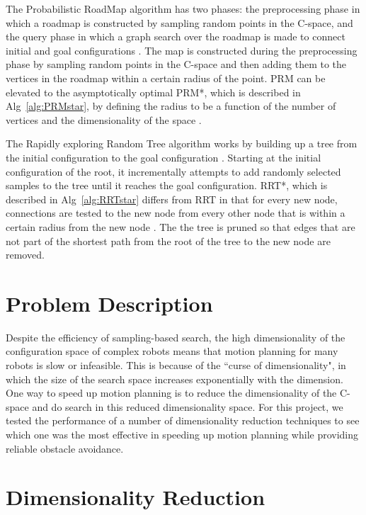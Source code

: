 \documentclass[12pt]{article}
\begin{document}
The Probabilistic RoadMap algorithm has two phases: the preprocessing phase in which a roadmap is constructed by sampling random points in the C-space, and the query phase in which a graph search over the roadmap is made to connect initial and goal configurations \cite{kavraki1996prm}. The map is constructed during the preprocessing phase by sampling random points in the C-space and then adding them to the vertices in the roadmap within a certain radius of the point. PRM can be elevated to the asymptotically optimal PRM*, which is described in Alg~\ref{alg:PRMstar}, by defining the radius to be a function of the number of vertices and the dimensionality of the space \cite{karaman2011sampling}.

The Rapidly exploring Random Tree algorithm works by building up a tree from the initial configuration to the goal configuration \cite{lavalle1998rrt}. Starting at the initial configuration of the root, it incrementally attempts to add randomly selected samples to the tree until it reaches the goal configuration. RRT*, which is described in Alg~\ref{alg:RRTstar} differs from RRT in that for every new node, connections are tested to the new node from every other node that is within a certain radius from the new node \cite{karaman2011sampling}. The the tree is pruned so that edges that are not part of the shortest path from the root of the tree to the new node are removed. 

\section{Problem Description}

Despite the efficiency of sampling-based search, the high dimensionality of the
configuration space of complex robots means that motion planning for many
robots is slow or infeasible. This is because of the ``curse of dimensionality",
in which the size of the search space increases exponentially with the
dimension. One way to speed up motion planning is to reduce the dimensionality
of the C-space and do search in this reduced dimensionality space. For this
project, we tested the performance of a number of dimensionality reduction
techniques to see which one was the most effective in speeding up motion
planning while providing reliable obstacle avoidance.

\section{Dimensionality Reduction}
\end{document}
